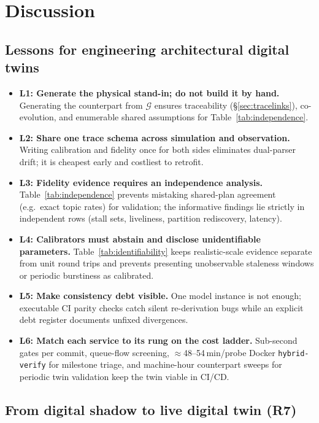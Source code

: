 \section{Discussion}
\label{sec:discussion}

\subsection{Lessons for engineering architectural digital twins}

\begin{itemize}[leftmargin=*,nosep]
  \item \textbf{L1: Generate the physical stand-in; do not build it by hand.} Generating the counterpart from $\mathcal{G}$ ensures traceability (\S\ref{sec:tracelinks}), co-evolution, and enumerable shared assumptions for Table~\ref{tab:independence}.
  \item \textbf{L2: Share one trace schema across simulation and observation.} Writing calibration and fidelity once for both sides eliminates dual-parser drift; it is cheapest early and costliest to retrofit.
  \item \textbf{L3: Fidelity evidence requires an independence analysis.} Table~\ref{tab:independence} prevents mistaking shared-plan agreement (e.g.\ exact topic rates) for validation; the informative findings lie strictly in independent rows (stall sets, liveliness, partition rediscovery, latency).
  \item \textbf{L4: Calibrators must abstain and disclose unidentifiable parameters.} Table~\ref{tab:identifiability} keeps realistic-scale evidence separate from unit round trips and prevents presenting unobservable staleness windows or periodic burstiness as calibrated.
  \item \textbf{L5: Make consistency debt visible.} One model instance is not enough; executable CI parity checks catch silent re-derivation bugs while an explicit debt register documents unfixed divergences.
  \item \textbf{L6: Match each service to its rung on the cost ladder.} Sub-second gates per commit, queue-flow screening, $\approx$48--54\,min/probe Docker \texttt{hybrid-verify} for milestone triage, and machine-hour counterpart sweeps for periodic twin validation keep the twin viable in CI/CD.
\end{itemize}

\subsection{From digital shadow to live digital twin (R7)}
\label{sec:livetwin}

